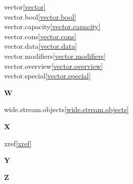 \begin{multicols}{2}
vector\quad\ref{vector}\\
vector.bool\quad\ref{vector.bool}\\
vector.capacity\quad\ref{vector.capacity}\\
vector.cons\quad\ref{vector.cons}\\
vector.data\quad\ref{vector.data}\\
vector.modifiers\quad\ref{vector.modifiers}\\
vector.overview\quad\ref{vector.overview}\\
vector.special\quad\ref{vector.special}\\
\par \textbf{W}\par
wide.stream.objects\quad\ref{wide.stream.objects}\\
\par \textbf{X}\par
xref\quad\ref{xref}\\
\par \textbf{Y}\par
\par \textbf{Z}\par
\end{multicols}

